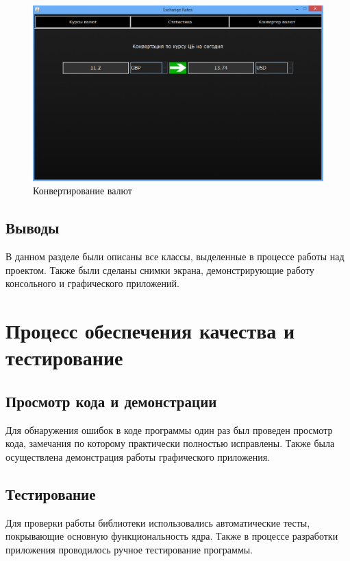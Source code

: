 \documentclass[a4paper]{article}
\begin{document}
\begin{figure}[H]
	\begin{center}
		\includegraphics[scale = 0.7]{screen/GUI_3.png}
		\caption{Конвертирование валют} 
		\label{pic:pic_name} %
	\end{center}
\end{figure}

\subsection{Выводы}

В данном разделе были описаны все классы, выделенные в процессе работы над проектом. Также были сделаны снимки экрана, демонстрирующие работу консольного и графического приложений.

\section{Процесс обеспечения качества и тестирование}

\subsection{Просмотр кода и демонстрации}

Для обнаружения ошибок в коде программы один раз был проведен просмотр кода, замечания по которому практически полностью исправлены. Также была осуществлена демонстрация работы графического приложения.

\subsection{Тестирование}

Для проверки работы библиотеки использовались автоматические тесты, покрывающие основную функциональность ядра. Также в процессе разработки приложения проводилось ручное тестирование программы.
\end{document}
